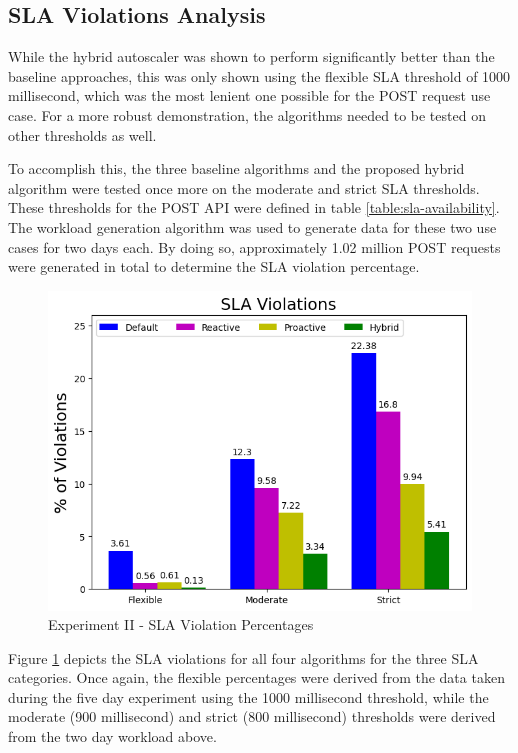 \subsection{SLA Violations Analysis}
\label{subsec:ch5-exp2-sla-violations}

While the hybrid autoscaler was shown to perform significantly better than the baseline approaches, this was only shown using the flexible SLA threshold of 1000 millisecond, which was the most lenient one possible for the POST request use case. For a more robust demonstration, the algorithms needed to be tested on other thresholds as well.\par

To accomplish this, the three baseline algorithms and the proposed hybrid algorithm were tested once more on the moderate and strict SLA thresholds. These thresholds for the POST API were defined in table \ref{table:sla-availability}. The workload generation algorithm was used to generate data for these two use cases for two days each. By doing so, approximately 1.02 million POST requests were generated in total to determine the SLA violation percentage.\par

\begin{figure}[htb]
    \centering
    \caption{Experiment II - SLA Violation Percentages}
    \label{fig:exp2-sla-violation-bar}
    \includegraphics[width=0.6\linewidth]{Figures/Compose-Post-SLA-Violations.png}
\end{figure}

Figure \ref{fig:exp2-sla-violation-bar} depicts the SLA violations for all four algorithms for the three SLA categories. Once again, the flexible percentages were derived from the data taken during the five day experiment using the 1000 millisecond threshold, while the moderate (900 millisecond) and strict (800 millisecond) thresholds were derived from the two day workload above.\par

